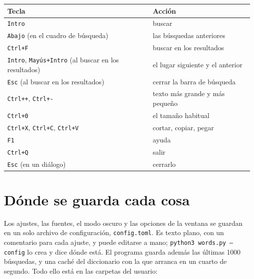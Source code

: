 \documentclass[12pt,
              article,
              oneside
              ]{memoir}
\newcommand*{\key}[1]{\texttt{#1}}
\begin{document}
%
\begin{longtable}{@{}>{\raggedright}p{}p{}@{}}
\toprule
Tecla & Acción\\
\midrule
\endhead
\key{Intro} & buscar\\
\key{Abajo} (en el cuadro de búsqueda) & las búsquedas anteriores\\
\key{Ctrl+F} & buscar en los resultados\\
\key{Intro}, \key{Mayús+Intro} (al buscar en los resultados) & el lugar siguiente y el anterior\\
\key{Esc} (al buscar en los resultados) & cerrar la barra de búsqueda\\
\key{Ctrl++}, \key{Ctrl+-} & texto más grande y más pequeño\\
\key{Ctrl+0} & el tamaño habitual\\
\key{Ctrl+X}, \key{Ctrl+C}, \key{Ctrl+V} & cortar, copiar, pegar\\
\key{F1} & ayuda\\
\key{Ctrl+Q} & salir\\
\key{Esc} (en un diálogo) & cerrarlo\\
\bottomrule
\end{longtable}

\section{Dónde se guarda cada cosa}
\label{sec:files}

%
Los ajustes, las fuentes, el modo oscuro y las opciones de la ventana se
guardan en un solo archivo de configuración, \texttt{config.toml}. Es
texto plano, con un comentario para cada ajuste, y puede editarse a mano;
\texttt{python3 words.py --config} lo crea y dice dónde está. El programa
guarda además las últimas 1000 búsquedas, y una caché del diccionario con
la que arranca en un cuarto de segundo. Todo ello está en las carpetas
del usuario:
\end{document}
